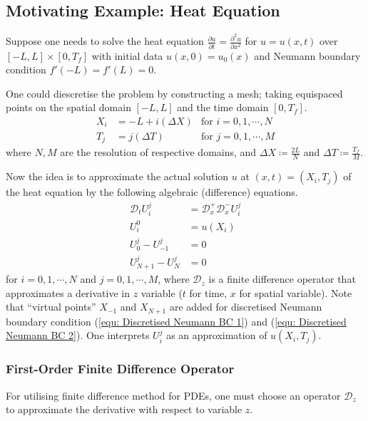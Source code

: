 \documentclass[../dissertation.tex]{subfiles}
\begin{document}
\subsection{Motivating Example: Heat Equation}
Suppose one needs to solve the heat equation $\frac{\partial u}{\partial t} = \frac{\partial^2 u}{\partial x^2}$ for $u = u(x,t)$ over $\left[ -L, L \right] \times \left[ 0, T_f \right]$
with initial data $u\left( x,0 \right) = u_0 (x)$
and Neumann boundary condition $f'(-L) = f'(L) = 0$.

One could diescretise the problem by constructing a mesh;
taking equispaced points on the spatial domain $\left[ -L,L \right]$
and the time domain $\left[ 0,T_f \right]$.
\begin{align*}
    X_i &= -L + i \left( \Delta X \right) & \text{for } i = 0, 1, \cdots, N \\
    T_j &= j \left( \Delta T \right) & \text{for } j = 0, 1, \cdots, M
\end{align*}
where $N, M$ are the resolution of respective domains,
and $\Delta X \coloneqq \frac{2L}{N}$ and $\Delta T \coloneqq \frac{T_f}{M}$.

Now the idea is to approximate the actual solution $u$ at $\left( x,t \right) = \left( X_i, T_j \right)$ of the heat equation by the following algebraic (difference) equations.
\begin{align}
    \mathcal{D}_t U_{i}^j &= \mathcal{D}_x^+ \mathcal{D}_x^- U_{i}^j 
    \label{equ: Discretised Heat Equation}
    \\
    U_{i}^0 &= u\left( X_i \right) \\
    U_{0}^j - U_{-1}^j &= 0
    \label{equ: Discretised Neumann BC 1}
    \\
    U_{N+1}^j - U_{N}^j &= 0
    \label{equ: Discretised Neumann BC 2}
\end{align}
for $i=0,1,\cdots,N$ and $j = 0, 1, \cdots, M$,
where $\mathcal{D}_z$ is a finite difference operator that approximates a derivative in $z$ variable ($t$ for time, $x$ for spatial variable).
Note that ``virtual points'' $X_{-1}$ and $X_{N+1}$ are added for discretised Neumann boundary condition (\ref{equ: Discretised Neumann BC 1}) and (\ref{equ: Discretised Neumann BC 2}).
One interprets $U_i^j$ as an approximation of $u \left( X_i, T_j \right)$.

\subsubsection{First-Order Finite Difference Operator}
For utilising finite difference method for PDEs, one must choose an operator $\mathcal{D}_z$ to approximate the derivative with respect to variable $z$.
\end{document}
